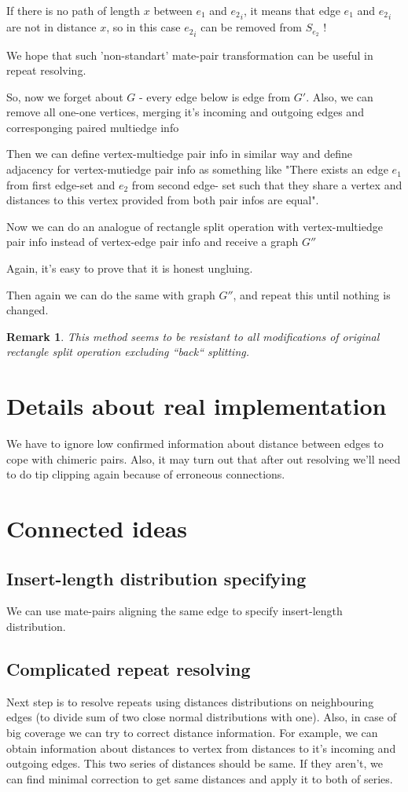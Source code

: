 \documentclass[12pt,a4paper,oneside]{article}
\newtheorem{remark}{Remark}
\begin{document}
If there is no path of length $x$ between $e_1$ and ${e_2}_i$, it means
that edge $e_1$ and ${e_2}_i$ are not in distance $x$, so in this case
${e_2}_i$ can be removed from $S_{e_2}$ !

We hope that such 'non-standart' mate-pair transformation
can be useful in repeat resolving.


So, now we forget about $G$ - every edge below  is edge from $G'$.
Also, we can remove all one-one vertices, merging it's incoming and outgoing edges and corresponging paired multiedge info

Then we can define vertex-multiedge pair info in similar way and
define adjacency for vertex-mutiedge pair info as something like
"There exists an edge $e_1$ from first edge-set and  $e_2$ from second
edge- set such that they share a vertex and distances to this vertex
provided from both pair infos are equal".

Now we can do an analogue of rectangle split operation with
vertex-multiedge pair info instead of vertex-edge pair info and
receive a graph $G''$

Again, it's easy to prove that it is honest ungluing.

Then again we can do the same with graph $G''$, and repeat this until
nothing is changed.
\begin{remark}
This method seems to be resistant to all  modifications of original rectangle split operation excluding ``back`` splitting.
\end{remark}
\section{Details about real implementation}
We have to ignore low confirmed information about distance between edges to cope with chimeric pairs. Also, it may turn out that after out resolving we'll need to do tip clipping again because of erroneous connections.

\section{Connected ideas}
\subsection{Insert-length distribution specifying}
We can use mate-pairs aligning the same edge to specify insert-length distribution.
\subsection{Complicated repeat resolving}
Next step is to resolve repeats using distances distributions on neighbouring edges (to divide sum of two close normal distributions with one). Also, in case of big coverage we can try to correct distance information. For example, we can obtain information about distances to vertex from distances to it's incoming and outgoing edges. This two series  of distances should be same. If they aren't, we can find minimal correction to get same distances and apply it to both of series.    
\end{document}

